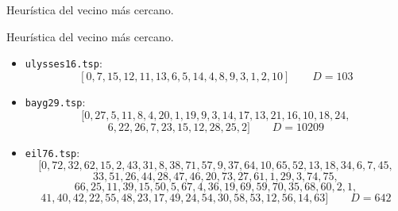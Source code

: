 \documentclass[10pt, xcolor=table]{beamer}
\begin{document}
\begin{frame}[fragile]{Heurística del vecino más cercano. }
\begin{center}
\scalebox{0.75}{

}
\end{center}
\end{frame}

\begin{frame}[fragile]{Heurística del vecino más cercano. }
\begin{itemize}
	\item \texttt{ulysses16.tsp}:
	\[
		[0,7,15,12,11,13,6,5,14,4,8,9,3,1,2,10] \qquad D = 103
	\]

	\item \texttt{bayg29.tsp}:
	\[
		[0,27,5,11,8,4,20,1,19,9,3,14,17,13,21,16,10,18,24,
	\]
	\[
		6,22,26,7,23,15,12,28,25,2] \qquad D = 10209
	\]
	
	\item \texttt{eil76.tsp}:
	\[
		[0,72,32,62,15,2,43,31,8,38,71,57,9,37,64,10,65,52,13,18,34,6,7,45,
	\]
	\[
		33,51,26,44,28, 47,46,20,73, 27, 61,1,29,3,74,75,
	\]
	\[
		66,25,11,39,15,50,5,67,4,36,19,69,59,70,35,68,60,2,1,
	\]
	\[
		41,40,42,22,55,48,23,17,49,24,54,30,58,53,12,56,14,63] \qquad D = 642
	\]
\end{itemize}
\end{frame}
\end{document}
